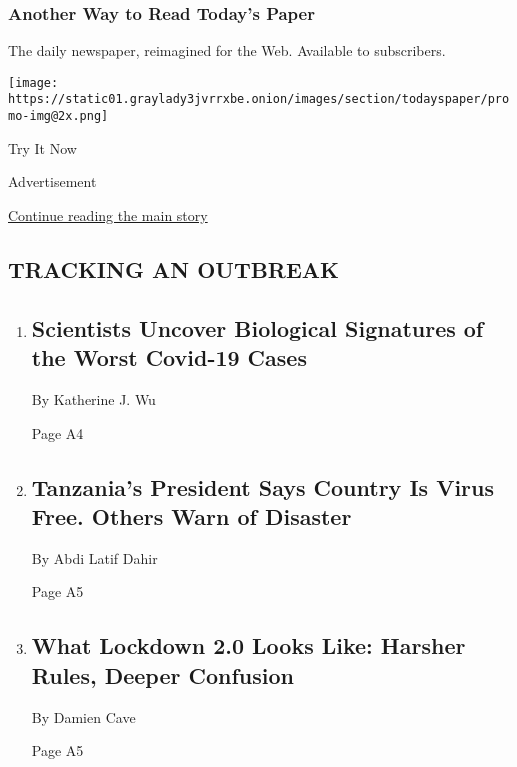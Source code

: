 \hypertarget{another-way-to-read-todays-paper}{%
\subsubsection{Another Way to Read Today's
Paper}\label{another-way-to-read-todays-paper}}

The daily newspaper, reimagined for the Web. Available to subscribers.

\texttt{[image: https://static01.graylady3jvrrxbe.onion/images/section/todayspaper/promo-img@2x.png]}

Try It Now

Advertisement

\protect\hyperlink{after-mid1}{Continue reading the main story}

\hypertarget{tracking-an-outbreak}{%
\subsection{TRACKING AN OUTBREAK}\label{tracking-an-outbreak}}

\begin{enumerate}
\def\labelenumi{\arabic{enumi}.}
\item
  \href{/2020/08/04/health/coronavirus-immune-system.html}{}

  \hypertarget{scientists-uncover-biological-signatures-of-the-worst-covid-19-cases}{%
  \subsection{Scientists Uncover Biological Signatures of the Worst
  Covid-19
  Cases}\label{scientists-uncover-biological-signatures-of-the-worst-covid-19-cases}}

  By Katherine J. Wu

  Page A4
\item
  \href{/2020/08/04/world/africa/tanzanias-coronavirus-president.html}{}

  \hypertarget{tanzanias-president-says-country-is-virus-free-others-warn-of-disaster}{%
  \subsection{Tanzania's President Says Country Is Virus Free. Others
  Warn of
  Disaster}\label{tanzanias-president-says-country-is-virus-free-others-warn-of-disaster}}

  By Abdi Latif Dahir

  Page A5
\item
  \href{/2020/08/04/world/australia/coronavirus-melbourne-lockdown.html}{}

  \hypertarget{what-lockdown-20-looks-like-harsher-rules-deeper-confusion}{%
  \subsection{What Lockdown 2.0 Looks Like: Harsher Rules, Deeper
  Confusion}\label{what-lockdown-20-looks-like-harsher-rules-deeper-confusion}}

  By Damien Cave

  Page A5
\end{enumerate}

